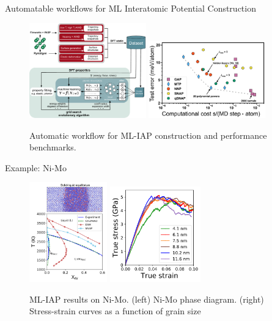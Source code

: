 \documentclass[aspectratio=169]{beamer}
\begin{document}
\begin{frame}{Automatable workflows for ML Interatomic Potential Construction}
    \begin{figure}
        \centering
        \includegraphics[width=0.45\textwidth]{lectures/slides_tex/figures/mliapworkflow.pdf}
        \includegraphics[width=0.45\textwidth]{lectures/slides_tex/figures/mliapcostvsperformance.pdf}
        \caption{Automatic workflow for ML-IAP construction and performance benchmarks.\cite{zuoPerformanceCostAssessment2020}}
    \end{figure}
\end{frame}


\begin{frame}{Example: Ni-Mo}
        \begin{figure}
        \centering
        \includegraphics[width=0.3\textwidth]{lectures/slides_tex/figures/ni-mo_pd.png}
        \includegraphics[width=0.35\textwidth]{lectures/slides_tex/figures/ni-mo-stress-strain.png}
        \caption{ML-IAP results on Ni-Mo. (left) Ni-Mo phase diagram. (right) Stress-strain curves as a function of grain size\cite{zuoPerformanceCostAssessment2020}}
    \end{figure}
\end{frame}
\end{document}
